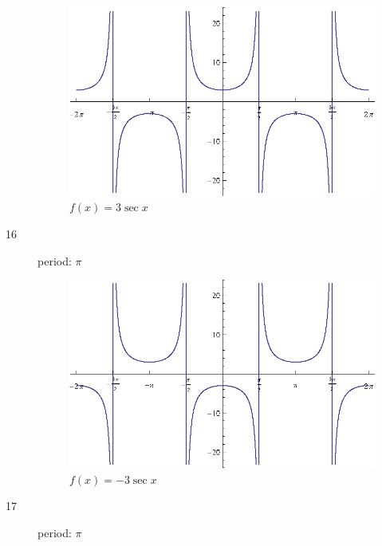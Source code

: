 \documentclass{exam}
\begin{document}
\begin{description}
        \begin{figure}[H]
          \centering
          \includegraphics[scale=0.8]{exercise15.eps}
          \caption{$f(x) = 3 \sec x$}
        \end{figure}

      \item[16]
        period: $\pi$

        \begin{figure}[H]
          \centering
          \includegraphics[scale=0.8]{exercise16.eps}
          \caption{$f(x) = -3 \sec x$}
        \end{figure}

      \item[17]
        period: $\pi$


\end{description}
\end{document}
